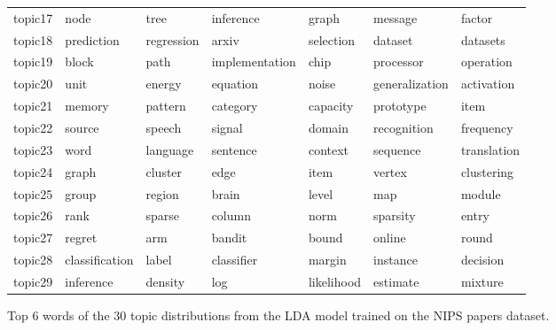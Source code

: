 \documentclass[letterpaper]{article}
\begin{document}
\begin{figure}[ht]
\begin{tabular}{l | l l l l l l}
    topic17 & node & tree & inference & graph & message & factor \\
    topic18 & prediction & regression & arxiv & selection & dataset & datasets \\
    topic19 & block & path & implementation & chip & processor & operation \\
    topic20 & unit & energy & equation & noise & generalization & activation \\
    topic21 & memory & pattern & category & capacity & prototype & item \\
    topic22 & source & speech & signal & domain & recognition & frequency \\
    topic23 & word & language & sentence & context & sequence & translation \\
    topic24 & graph & cluster & edge & item & vertex & clustering \\
    topic25 & group & region & brain & level & map & module \\
    topic26 & rank & sparse & column & norm & sparsity & entry \\
    topic27 & regret & arm & bandit & bound & online & round \\
    topic28 & classification & label & classifier & margin & instance & decision \\
    topic29 & inference & density & log & likelihood & estimate & mixture \\
  \end{tabular}
  \caption{\label{fig:lda_results} Top 6 words of the 30 topic distributions from the LDA model trained on the NIPS papers dataset.}
\end{figure}
\end{document}
